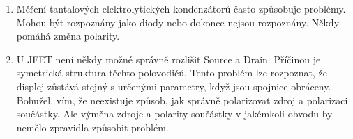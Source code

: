 \begin{enumerate}
\item Měření tantalových elektrolytických kondenzátorů často způsobuje problémy.
Mohou být rozpoznány jako diody nebo dokonce nejsou rozpoznány.
Někdy pomáhá změna polarity.

\item U JFET není někdy možné správně rozlišit Source a Drain.
Příčinou je symetrická struktura těchto polovodičů.
Tento problém lze rozpoznat, že displej zůstává stejný s určenými parametry,
když jsou spojnice obráceny.
Bohužel, vím, že neexistuje způsob, jak správně polarizovat zdroj a polarizaci součástky.
Ale výměna zdroje a polarity součástky v jakémkoli obvodu by nemělo zpravidla způsobit problém.

\end{enumerate}
